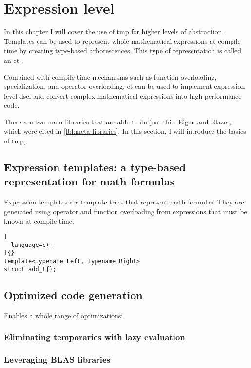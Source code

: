\documentclass[../main]{subfiles}
\begin{document}
\section{
  Expression level
}
\label{lbl:expression-level-metaprogramming}

In this chapter I will cover the use of \gls{tmp} for higher levels
of abstraction. Templates can be used to represent whole mathematical
expressions at compile time by creating type-based arborescences.
This type of representation is called an \gls{et} \cite{veldhuizen:1995}.

Combined with compile-time mechanisms such as function overloading,
specialization, and operator overloading, \gls{et}\acrpluralsuffix{} can be used to
implement expression level \gls{dsel}\acrpluralsuffix{} and convert complex
mathematical expressions into high performance code.

There are two main libraries that are able to do just this: Eigen \cite{eigen}
and Blaze \cite{blazelib}, which were cited in \ref{lbl:meta-libraries}.
In this section, I will introduce the basics of \cpp \gls{tmp},

\subsection{
  Expression templates: a type-based representation for math formulas
}

Expression templates are template trees that represent math formulas.
They are generated using operator and function overloading from expressions
that must be known at compile time.

\begin{lstlisting}[
  language=c++
]{}
template<typename Left, typename Right>
struct add_t{};
\end{lstlisting}


\subsection{
  Optimized code generation
}


Enables a whole range of optimizations:

\subsubsection{
  Eliminating temporaries with lazy evaluation
}

\subsubsection{
  Leveraging BLAS libraries
}
\end{document}
